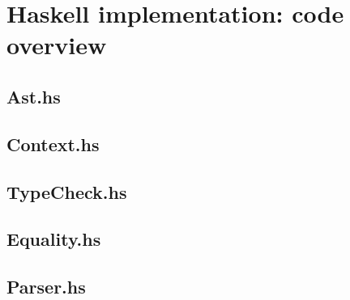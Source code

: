 \section{Haskell implementation: code overview}
\subsection{Ast.hs}
\subsection{Context.hs}
\subsection{TypeCheck.hs}
\subsection{Equality.hs}\label{equal}
\subsection{Parser.hs}